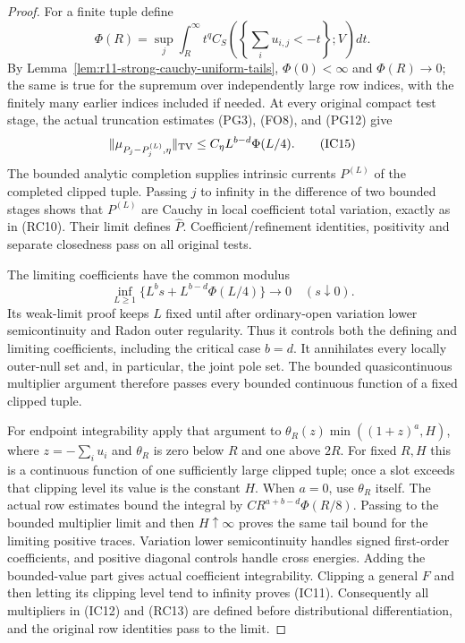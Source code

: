 \begin{proof}
For a finite tuple define
\[
 \Phi(R)=\sup_j\int_R^\infty t^q
          C_S\!\left(\left\{\sum_i u_{i,j}<-t\right\};V\right)dt.
 \tag{IC14}
\]
By Lemma~\ref{lem:r11-strong-cauchy-uniform-tails},
$\Phi(0)<\infty$ and $\Phi(R)\to0$; the same is true for
the supremum over independently large row indices, with the
finitely many earlier indices included if needed. At every
original compact test stage, the actual truncation estimates
(PG3), (FO8), and (PG12) give
\[
 \|\mu_{P_j-P_j^{(L)},\eta}\|_{\rm TV}
             \leq C_\eta L^{b-d}\Phi(L/4).
 \tag{IC15}
\]
The bounded analytic completion supplies intrinsic currents
$P^{(L)}$ of the completed clipped tuple. Passing $j$ to
infinity in the difference of two bounded stages shows that
$P^{(L)}$ are Cauchy in local coefficient total variation,
exactly as in (RC10). Their limit defines $\widehat P$.
Coefficient/refinement identities, positivity and separate
closedness pass on all original tests.

The limiting coefficients have the common modulus
\[
    \inf_{L\geq1}\{L^b s+L^{b-d}\Phi(L/4)\}
                              \longrightarrow0\quad(s\downarrow0).
 \tag{IC16}
\]
Its weak-limit proof keeps $L$ fixed until after ordinary-open
variation lower semicontinuity and Radon outer regularity.
Thus it controls both the defining and limiting coefficients,
including the critical case $b=d$. It annihilates every
locally outer-null set and, in particular, the joint pole set.
The bounded quasicontinuous multiplier argument therefore
passes every bounded continuous function of a fixed clipped
tuple.

For endpoint integrability apply that argument to
$\theta_R(z)\min((1+z)^a,H)$, where
$z=-\sum_i u_i$ and $\theta_R$ is zero below $R$ and one
above $2R$. For fixed $R,H$ this is a continuous function
of one sufficiently large clipped tuple; once a slot exceeds
that clipping level its value is the constant $H$.
When $a=0$, use $\theta_R$ itself. The actual row estimates
bound the integral by
$C R^{a+b-d}\Phi(R/8)$. Passing to the bounded multiplier
limit and then $H\uparrow\infty$ proves the same tail bound
for the limiting positive traces. Variation lower
semicontinuity handles signed first-order coefficients, and
positive diagonal controls handle cross energies.
Adding the bounded-value part gives actual coefficient
integrability. Clipping a general $F$ and then letting its
clipping level tend to infinity proves (IC11). Consequently
all multipliers in (IC12) and (RC13) are defined before
distributional differentiation, and the original row
identities pass to the limit.


\end{proof}
